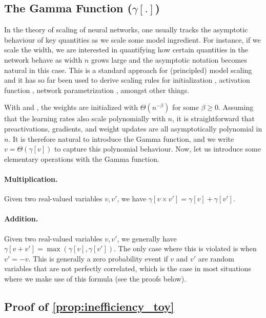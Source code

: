 \subsection{The Gamma Function \texorpdfstring{($\gamma[.]$)}{Gamma Function}}\label{sec:gamma_fct}

In the theory of scaling of neural networks, one usually tracks the asymptotic behaviour of key quantities as we scale some model ingredient. For instance, if we scale the width, we are interested in quantifying how certain quantities in the network behave as width $n$ grows large and the asymptotic notation becomes natural in this case. This is a standard approach for (principled) model scaling and it has so far been used to derive scaling rules for initialization \citep{deepinfoprop2017}, activation function \citep{hayou19activation}, network parametrization \citep{yang2023depth}, amongst other things.

With  and , the weights are initialized with $\Theta(n^{-\beta})$ for some $\beta \geq 0$. Assuming that the learning rates also scale polynomially with $n$, it is straightforward that preactivations, gradients, and weight updates are all asymptotically polynomial in $n$. It is therefore natural to introduce the Gamma function, and we write $v = \Theta(\gamma[v])$ to capture this polynomial behaviour. Now, let us introduce some elementary operations with the Gamma function.

\paragraph{Multiplication.} Given two real-valued variables $v,v'$, we  have $\gamma[v \times v'] = \gamma[v] + \gamma[v']$. 
\paragraph{Addition.} Given two real-valued variables $v,v'$, we generally have $\gamma[v + v'] = \max(\gamma[v], \gamma[v'])$. The only case where this is violated is when $v' = -v$. This is generally a zero probability event if $v$ and $v'$ are random variables that are not perfectly correlated, which is the case in most situations where we make use of this formula (see the proofs below). 

\subsection{Proof of \texorpdfstring{\cref{prop:inefficiency_toy}}{Proposition Inefficiency Toy}}

